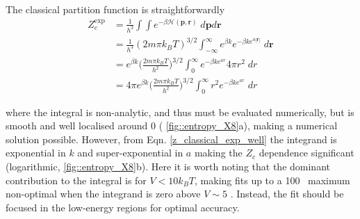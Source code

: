 \documentclass[../main.tex]{subfiles}
\begin{document}
The classical partition function is straightforwardly
\begin{equation}
\begin{aligned}
Z_c^\text{exp} &= \frac{1}{h^3}\int\int e^{-\beta \mathcal{H}(\boldsymbol{p}, \boldsymbol{r})} \; d\boldsymbol{p} d\boldsymbol{r} \\
&=  \frac{1}{h^3} (2m\pi k_B T)^{3/2}  \int_{-\infty}^\infty e^{\beta k}e^{-\beta k e^{a|\boldsymbol{r}|}} \;  d\boldsymbol{r} \\
&=   e^{\beta k}{\Big (} \frac{2m\pi k_B T}{h^2} {\Big )}^{3/2}  \int_{0}^\infty e^{-\beta k e^{a{r}}} 4\pi r^2\;  d{r} \\
&=  4\pi  e^{\beta k}{\Big (} \frac{2m\pi k_B T}{h^2} {\Big )}^{3/2}  \int_{0}^\infty r^2 e^{-\beta k e^{a{r}}} \;  d{r}
\end{aligned}
\label{z_classical_exp_well}
\end{equation}

where the integral is non-analytic, and thus must be evaluated numerically, but is smooth and well localised around 0 (\figurename{ \ref{fig::entropy_X8}}a), making a numerical solution possible. However, from Eqn. \eqref{z_classical_exp_well} the integrand is exponential in $k$ and super-exponential in $a$ making the $Z_c$ dependence significant (logarithmic, \figurename{ \ref{fig::entropy_X8}}b). Here it is worth noting that the dominant contribution to the integral is for $V < 10k_B T$, making fits up to a 100 \kcal $\,$ maximum non-optimal when the integrand is zero above $V \sim 5$ \kcal. Instead, the fit should be focused in the low-energy regions for optimal accuracy.
\end{document}
